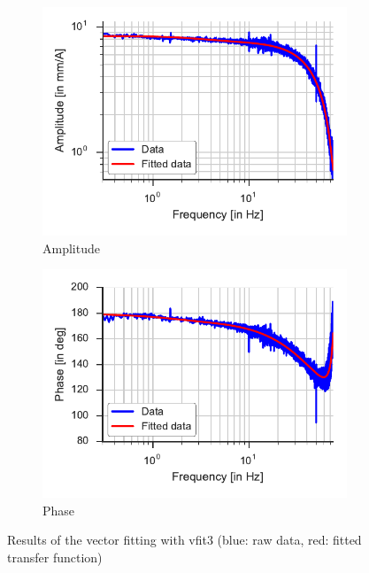 \begin{figure}
	\begin{subfigure}[t]{0.5\linewidth}
		\includegraphics[width=1\linewidth]{img/ctl_id_amplitude}
		\caption{Amplitude}
	\end{subfigure}
	\hfill
	\begin{subfigure}[t]{0.5\linewidth}
		\includegraphics[width=1\linewidth]{img/ctl_id_phase}
		\caption{Phase}
	\end{subfigure}
	\caption[Results of the vector fitting with vfit3]{\label{fig:ctl_vfit3}Results of the vector fitting with vfit3 (blue: raw data, red: fitted transfer function)}
\end{figure}

